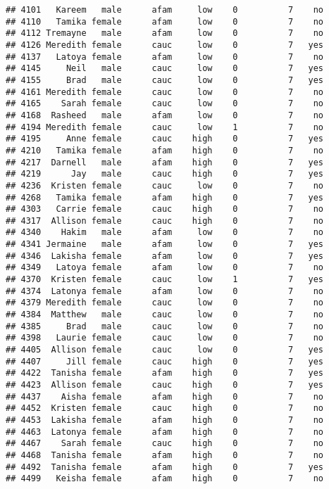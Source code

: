 \documentclass[
]{article}
\begin{document}
\begin{verbatim}
## 4101   Kareem   male      afam     low    0          7    no
## 4110   Tamika female      afam     low    0          7    no
## 4112 Tremayne   male      afam     low    0          7    no
## 4126 Meredith female      cauc     low    0          7   yes
## 4137   Latoya female      afam     low    0          7    no
## 4145     Neil   male      cauc     low    0          7   yes
## 4155     Brad   male      cauc     low    0          7   yes
## 4161 Meredith female      cauc     low    0          7    no
## 4165    Sarah female      cauc     low    0          7    no
## 4168  Rasheed   male      afam     low    0          7    no
## 4194 Meredith female      cauc     low    1          7    no
## 4195     Anne female      cauc    high    0          7   yes
## 4210   Tamika female      afam    high    0          7    no
## 4217  Darnell   male      afam    high    0          7   yes
## 4219      Jay   male      cauc    high    0          7   yes
## 4236  Kristen female      cauc     low    0          7    no
## 4268   Tamika female      afam    high    0          7   yes
## 4303   Carrie female      cauc    high    0          7    no
## 4317  Allison female      cauc    high    0          7    no
## 4340    Hakim   male      afam     low    0          7    no
## 4341 Jermaine   male      afam     low    0          7   yes
## 4346  Lakisha female      afam     low    0          7   yes
## 4349   Latoya female      afam     low    0          7    no
## 4370  Kristen female      cauc     low    1          7   yes
## 4374  Latonya female      afam     low    0          7    no
## 4379 Meredith female      cauc     low    0          7    no
## 4384  Matthew   male      cauc     low    0          7    no
## 4385     Brad   male      cauc     low    0          7    no
## 4398   Laurie female      cauc     low    0          7    no
## 4405  Allison female      cauc     low    0          7   yes
## 4407     Jill female      cauc    high    0          7   yes
## 4422  Tanisha female      afam    high    0          7   yes
## 4423  Allison female      cauc    high    0          7   yes
## 4437    Aisha female      afam    high    0          7    no
## 4452  Kristen female      cauc    high    0          7    no
## 4453  Lakisha female      afam    high    0          7    no
## 4463  Latonya female      afam    high    0          7    no
## 4467    Sarah female      cauc    high    0          7    no
## 4468  Tanisha female      afam    high    0          7    no
## 4492  Tanisha female      afam    high    0          7   yes
## 4499   Keisha female      afam    high    0          7    no

\end{verbatim}
\end{document}
